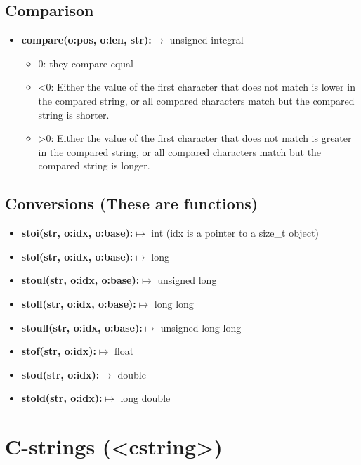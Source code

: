 \documentclass{report}
\begin{document}
    \subsection{Comparison}
    \begin{itemize}
        \item \textbf{compare(o:pos, o:len, str):}$\mapsto$ unsigned integral
            \begin{itemize}
                \item 0: they compare equal 
                \item <0: Either the value of the first character that does not match is lower in the compared string, or all compared characters match but the compared string is shorter.
                \item >0: Either the value of the first character that does not match is greater in the compared string, or all compared characters match but the compared string is longer.
            \end{itemize}
    \end{itemize}

    \bigbreak \noindent 
    \subsection{Conversions (These are functions)}
    \begin{itemize}
        \item \textbf{stoi(str, o:idx, o:base):}$\mapsto$ int (idx is a pointer to a size\_t object)
        \item \textbf{stol(str, o:idx, o:base):}$\mapsto$ long
        \item \textbf{stoul(str, o:idx, o:base):}$\mapsto$ unsigned long
        \item \textbf{stoll(str, o:idx, o:base):}$\mapsto$ long long
        \item \textbf{stoull(str, o:idx, o:base):}$\mapsto$ unsigned long long
        \item \textbf{stof(str, o:idx):}$\mapsto$ float
        \item \textbf{stod(str, o:idx):}$\mapsto$ double
        \item \textbf{stold(str, o:idx):}$\mapsto$ long double
    \end{itemize}

    \pagebreak \bigbreak \noindent 
    \section{\LARGE C-strings (<cstring>)}
    \bigbreak \noindent 
\end{document}

